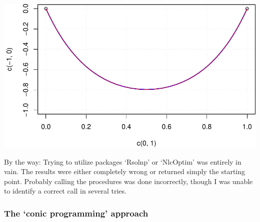 \documentclass[]{article}
\newenvironment{Shaded}{\begin{snugshade}}{\end{snugshade}}
\newcommand{\KeywordTok}[1]{\textcolor[rgb]{0.13,0.29,0.53}{\textbf{{#1}}}}
\newcommand{\DataTypeTok}[1]{\textcolor[rgb]{0.13,0.29,0.53}{{#1}}}
\newcommand{\DecValTok}[1]{\textcolor[rgb]{0.00,0.00,0.81}{{#1}}}
\newcommand{\FloatTok}[1]{\textcolor[rgb]{0.00,0.00,0.81}{{#1}}}
\newcommand{\StringTok}[1]{\textcolor[rgb]{0.31,0.60,0.02}{{#1}}}
\newcommand{\OtherTok}[1]{\textcolor[rgb]{0.56,0.35,0.01}{{#1}}}
\newcommand{\NormalTok}[1]{{#1}}
\begin{document}
\begin{Shaded}
\end{Shaded}

\includegraphics{catenary_files/figure-latex/unnamed-chunk-14-1.pdf}

By the way: Trying to utilize packages `Rsolnp' or `NlcOptim' was
entirely in vain. The results were either completely wrong or returned
simply the starting point. Probably calling the procedures was done
incorrectly, though I was unable to identify a correct call in several
tries.

\subsubsection{\texorpdfstring{The `conic programming'
approach}{The conic programming approach}}\label{the-conic-programming-approach}
\end{document}
